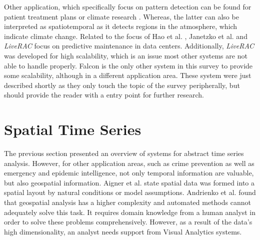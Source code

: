 \documentclass[electronic]{vgtc}             %
\begin{document}
Other application, which specifically focus on pattern detection can be found for patient treatment plans \cite{Gschwandtner:2011} or climate research \cite{Kehrer:2008}.
Whereas, the latter can also be interpreted as spatiotemporal as it detects regions in the atmosphere, which indicate climate change.
Related to the focus of Hao et al. \cite{Hao:2009, Hao:2011}, Janetzko et al. \cite{janetzko:2014} and \textit{LiveRAC} \cite{McLachlan:2008} focus on predictive maintenance in data centers.
Additionally, \textit{LiveRAC} was developed for high scalability, which is an issue most other systems are not able to handle properly.
Falcon \cite{steed:2017} is the only other system in this survey to provide some scalability, although in a different application area. 
These system were just described shortly as they only touch the topic of the survey peripherally, but should provide the reader with a entry point for further research.


\section{Spatial Time Series\label{sec:spatiotemp}}
The previous section presented an overview of systems for abstract time series analysis. 
However, for other application areas, such as crime prevention as well as emergency and epidemic intelligence, not only temporal information are valuable, but also geospatial information.
Aigner et al. \cite{Aigner:2007} state spatial data was formed into a spatial layout by natural conditions or model assumptions.
Andrienko et al. \cite{Andrienko:2008, Andrienko:2010:Space} found that geospatial analysis has a higher complexity and automated methods cannot adequately solve this task. 
It requires domain knowledge from a human analyst in order to solve these problems comprehensively.
However, as a result of the data's high dimensionality, an analyst needs support from Visual Analytics systems.
\end{document}
